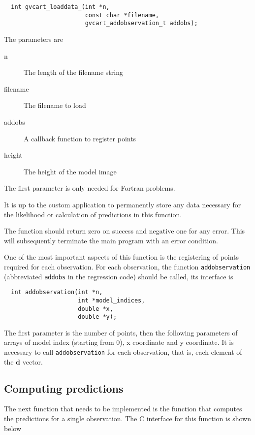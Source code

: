 \documentclass[a4paper,12pt]{article}
\begin{document}
\begin{verbatim}
  int gvcart_loaddata_(int *n,
                       const char *filename,
                       gvcart_addobservation_t addobs);
\end{verbatim}

The parameters are

\begin{description}
\item[n] The length of the filename string
\item[filename] The filename to load
\item[addobs] A callback function to register points
\item[height] The height of the model image
\end{description}

The first parameter is only needed for Fortran problems. 

It is up to the custom application to permanently store any data
necessary for the likelihood or calculation of predictions in this
function.

The function should return zero on success and negative one for any
error. This will subsequently terminate the main program with an
error condition.

One of the most important aspects of this function is the registering
of points required for each observation. For each observation,
the function \texttt{addobservation} (abbreviated \texttt{addobs} in the
regression code) should be called, its interface is

\begin{verbatim}
  int addobservation(int *n,
                     int *model_indices,
                     double *x,
                     double *y);
\end{verbatim}

The first parameter is the number of points, then the following parameters
of arrays of model index (starting from 0), x coordinate and y coordinate.
It is necessary to call \texttt{addobservation} for each observation, that
is, each element of the $\mathbf{d}$ vector.

\subsection{Computing predictions}

The next function that needs to be implemented is the function that
computes the predictions for a single observation. The C interface for
this function is shown below
\end{document}
